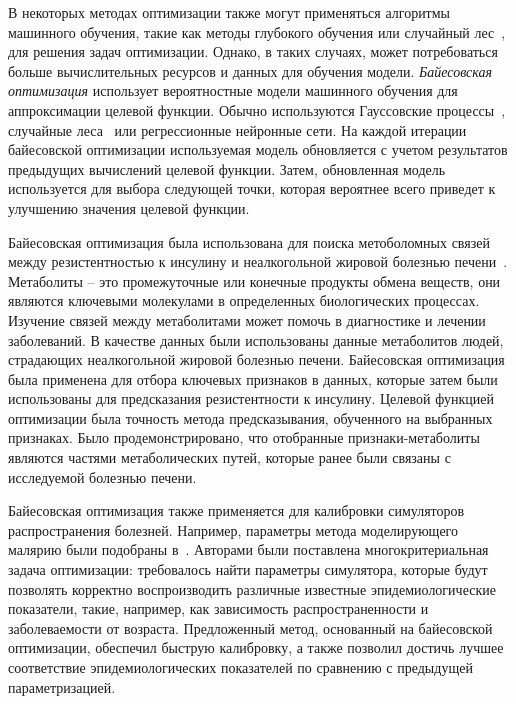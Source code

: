 В некоторых методах оптимизации также могут применяться алгоритмы машинного обучения, такие как методы глубокого обучения или случайный лес~\cite{ho1995random}, для решения задач оптимизации.
Однако, в таких случаях, может потребоваться больше вычислительных ресурсов и данных для обучения модели.
\emph{Байесовская оптимизация} использует вероятностные модели машинного обучения для аппроксимации целевой функции.
Обычно используются Гауссовские процессы~\cite{williams1995gaussian}, случайные леса~\cite{ho1995random} или регрессионные нейронные сети.
На каждой итерации байесовской оптимизации используемая модель обновляется с учетом результатов предыдущих вычислений целевой функции.
Затем, обновленная модель используется для выбора следующей точки, которая вероятнее всего приведет к улучшению значения целевой функции.

Байесовская оптимизация была использована для поиска метоболомных связей между резистентностью к инсулину и неалкогольной жировой болезнью печени~\cite{franken2012inferring}.
Метаболиты -- это промежуточные или конечные продукты обмена веществ, они являются ключевыми молекулами в определенных биологических процессах.
Изучение связей между метаболитами может помочь в диагностике и лечении заболеваний.
В качестве данных были использованы данные метаболитов людей, страдающих неалкогольной жировой болезнью печени.
Байесовская оптимизация была применена для отбора ключевых признаков в данных, которые затем были использованы для предсказания резистентности к инсулину.
Целевой функцией оптимизации была точность метода предсказывания, обученного на выбранных признаках.
Было продемонстрировано, что отобранные признаки-метаболиты являются частями метаболических путей, которые ранее были связаны с исследуемой болезнью печени.

Байесовская оптимизация также применяется для калибровки симуляторов распространения болезней. Например, параметры метода моделирующего малярию были подобраны в~\cite{reiker2021emulator}.
Авторами были поставлена многокритериальная задача оптимизации: требовалось найти параметры симулятора, которые будут позволять корректно воспроизводить различные известные эпидемиологические показатели, такие, например, как зависимость распространенности и заболеваемости от возраста.
Предложенный метод, основанный на байесовской оптимизации, обеспечил быструю калибровку, а также позволил достичь лучшее соответствие эпидемиологических показателей по сравнению с предыдущей параметризацией.

